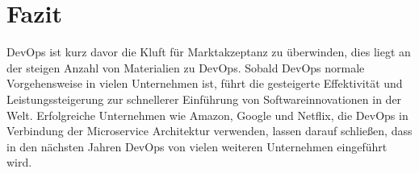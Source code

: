 \section{Fazit}
DevOps ist kurz davor die Kluft für Marktakzeptanz zu überwinden, dies liegt an der steigen Anzahl von Materialien zu DevOps. Sobald DevOps normale Vorgehensweise in vielen Unternehmen ist, führt die gesteigerte Effektivität und Leistungssteigerung zur schnellerer Einführung von Softwareinnovationen in der Welt. Erfolgreiche Unternehmen wie Amazon, Google und Netflix, die DevOps in Verbindung der  Microservice Architektur verwenden, lassen darauf schließen, dass in den nächsten Jahren DevOps von vielen weiteren Unternehmen eingeführt wird.